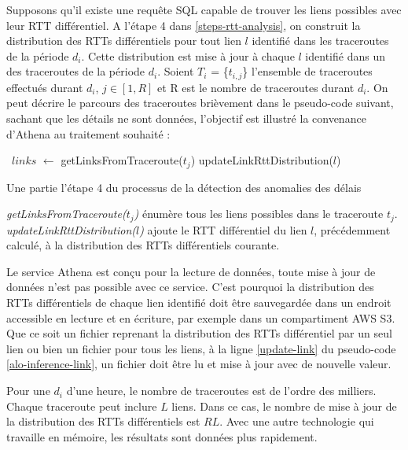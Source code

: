 Supposons qu'il existe une requête SQL capable de trouver les liens possibles avec leur RTT différentiel. A l'étape 4 dans \ref{steps-rtt-analysis}, on construit la distribution des RTTs différentiels pour tout lien $l$ identifié dans les traceroutes de la période $d_i$. Cette distribution est mise à jour à chaque $l$  identifié dans un des traceroutes  de la période $d_i$. Soient  $T_i$ = \{$t_{i, j}$\}  l'ensemble de traceroutes effectués durant $d_i$,  $j \in [1, R]$ et R est le nombre de traceroutes durant $d_i$. On peut décrire le parcours des traceroutes brièvement dans le pseudo-code suivant, sachant que les détails ne sont données, l'objectif est illustré la convenance d'Athena au traitement souhaité :
\begin{algorithm}[H]
\begin{algorithmic}[1]
	  \
	  \State $links$ $\leftarrow$ getLinksFromTraceroute($t_j$)
	  	 		\State updateLinkRttDistribution($l$) \label{update-link}
	  	 \EndFor
	 \EndFor
\end{algorithmic}
\caption{Une partie l'étape 4 du processus de la détection des anomalies des délais }
\label{alo-inference-link}
\end{algorithm}

\textit{getLinksFromTraceroute($t_j$)} énumère tous les liens possibles dans le traceroute $t_j$.
\textit{updateLinkRttDistribution($l$)} ajoute le RTT différentiel du lien $l$, précédemment calculé, à la distribution des RTTs différentiels courante.

Le service Athena est conçu pour la lecture de données, toute mise à jour de données n'est pas possible avec ce service. C'est pourquoi la distribution des RTTs différentiels de chaque  lien identifié doit être sauvegardée dans un endroit accessible en lecture et en écriture, par exemple dans un compartiment AWS S3. Que ce soit un fichier reprenant la distribution des RTTs différentiel  par un seul lien ou bien un fichier pour tous les liens,   à la ligne  \ref{update-link} du pseudo-code \ref{alo-inference-link}, un fichier doit être lu et mise à jour avec de nouvelle valeur.

Pour une $d_i$ d'une heure, le nombre de traceroutes est de l'ordre des milliers. Chaque traceroute peut inclure $L$ liens. Dans ce cas, le nombre de mise à jour de la distribution des RTTs différentiels est $R$\texttimes$L$. Avec une autre technologie qui travaille en mémoire, les résultats sont données plus rapidement. 







